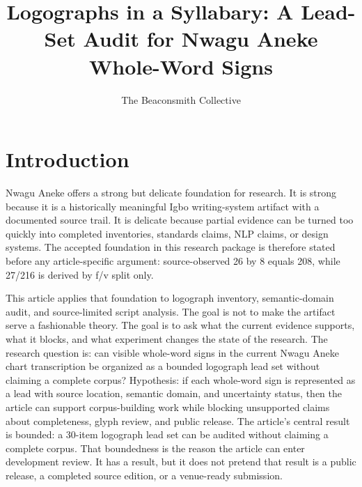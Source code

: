 \documentclass[sigconf,nonacm]{acmart}
\title{Logographs in a Syllabary: A Lead-Set Audit for Nwagu Aneke Whole-Word Signs}
\author{The Beaconsmith Collective}
\affiliation{\institution{Etisiobi Research Studio}\city{Enugu}\country{Nigeria}}
\begin{document}
\maketitle

\section{Introduction}
Nwagu Aneke offers a strong but delicate foundation for research. It is strong
because it is a historically meaningful Igbo writing-system artifact with a
documented source trail. It is delicate because partial evidence can be turned
too quickly into completed inventories, standards claims, NLP claims, or design
systems. The accepted foundation in this research package is therefore stated
before any article-specific argument: source-observed 26 by 8 equals 208, while
27/216 is derived by f/v split only.

This article applies that foundation to logograph inventory, semantic-domain audit, and source-limited script analysis. The goal is not to make the
artifact serve a fashionable theory. The goal is to ask what the current
evidence supports, what it blocks, and what experiment changes the state of the
research. The research question is: can visible whole-word signs in the current
Nwagu Aneke chart transcription be organized as a bounded logograph lead set
without claiming a complete corpus? Hypothesis: if each whole-word sign is
represented as a lead with source location, semantic domain, and uncertainty
status, then the article can support corpus-building work while blocking
unsupported claims about completeness, glyph review, and public release. The
article's central result is bounded: a 30-item logograph lead set can be audited
without claiming a complete corpus. That boundedness is the reason the article
can enter development review. It has a result, but it does not pretend that
result is a public release, a completed source edition, or a venue-ready
submission.
\end{document}
